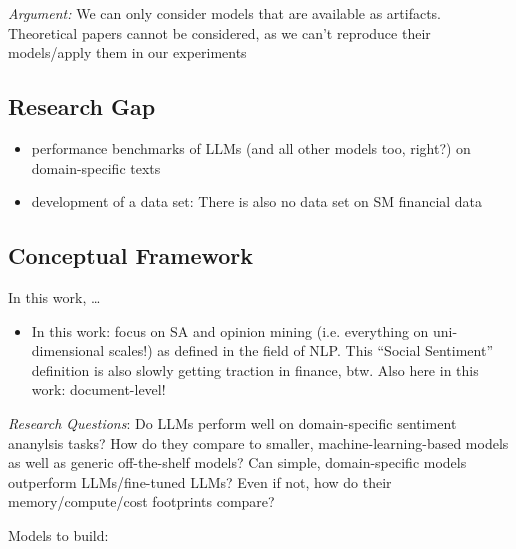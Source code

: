 \emph{Argument:} We can only consider models that are available as artifacts. Theoretical papers cannot be considered, as we can't reproduce their models/apply them in our experiments










\subsection{Research Gap}
\begin{itemize}[noitemsep]
	\item performance benchmarks of LLMs (and all other models too, right?) on domain-specific texts
	\item development of a data set: There is also no data set on SM financial data 	
\end{itemize}







\subsection{Conceptual Framework}

In this work, \dots 

\begin{itemize}[noitemsep]
	\item In this work: focus on SA and opinion mining (i.e. everything on uni-dimensional scales!) as defined in the field of NLP. This ``Social Sentiment'' definition is also slowly getting traction in finance, btw. Also here in this work: document-level!
\end{itemize}





\emph{Research Questions}: Do LLMs perform well on domain-specific sentiment ananylsis tasks? How do they compare to smaller, machine-learning-based models as well as generic off-the-shelf models? Can simple, domain-specific models outperform LLMs/fine-tuned LLMs? Even if not, how do their memory/compute/cost footprints compare? 

Models to build:










